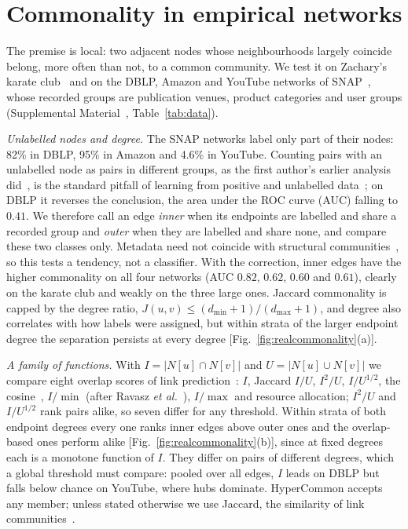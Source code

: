 \section{Commonality in empirical networks}
\label{sec:commonality}

The premise is local: two adjacent nodes whose neighbourhoods largely coincide belong,
more often than not, to a common community. We test it on Zachary's karate
club~\cite{zachary1977information} and on the DBLP, Amazon and YouTube networks of
SNAP~\cite{yang2015defining}, whose recorded groups are publication venues, product
categories and user groups (Supplemental Material~\cite{supplement},
Table~\ref{tab:data}).

\emph{Unlabelled nodes and degree.} The SNAP networks label only part of their nodes:
82\% in DBLP, 95\% in Amazon and 4.6\% in YouTube. Counting pairs with an unlabelled node
as pairs in different groups, as the first author's earlier analysis
did~\cite{deinega2023thesis}, is the standard pitfall of learning from positive and
unlabelled data~\cite{elkan2008learning}; on DBLP it reverses the conclusion, the area
under the ROC curve (AUC) falling to $0.41$. We therefore call an edge \emph{inner} when
its endpoints are labelled and share a recorded group and \emph{outer} when they are
labelled and share none, and compare these two classes only. Metadata need not coincide
with structural communities~\cite{peel2017ground,hric2014community}, so this tests a
tendency, not a classifier. With the correction, inner edges have the higher commonality on all four networks (AUC $0.82$, $0.62$, $0.60$ and $0.61$), clearly on the karate club and weakly on the three large ones. Jaccard commonality is capped
by the degree ratio, $J(u,v)\le(d_{\min}+1)/(d_{\max}+1)$, and degree also correlates
with how labels were assigned, but within strata of the larger endpoint degree the
separation persists at every degree [Fig.~\ref{fig:realcommonality}(a)].

\emph{A family of functions.} With $I=|N[u]\cap N[v]|$ and $U=|N[u]\cup N[v]|$ we compare
eight overlap scores of link
prediction~\cite{leicht2006vertex,zhou2009predicting,lu2011link}: $I$, Jaccard $I/U$,
$I^2/U$, $I/U^{1/2}$, the cosine~\cite{salton1983introduction}, $I/\min$ (after Ravasz
\emph{et al.}~\cite{ravasz2002hierarchical}), $I/\max$ and resource allocation; $I^2/U$
and $I/U^{1/2}$ rank pairs alike, so seven differ for any threshold. Within strata of
both endpoint degrees every one ranks inner edges above outer ones and the overlap-based ones perform
alike [Fig.~\ref{fig:realcommonality}(b)], since at fixed degrees each is a monotone
function of $I$. They differ on pairs of different degrees, which a global threshold
must compare: pooled over all edges, $I$ leads on DBLP but falls below chance on
YouTube, where hubs dominate. HyperCommon accepts any member; unless stated otherwise we
use Jaccard, the similarity of link communities~\cite{ahn2010link}.

